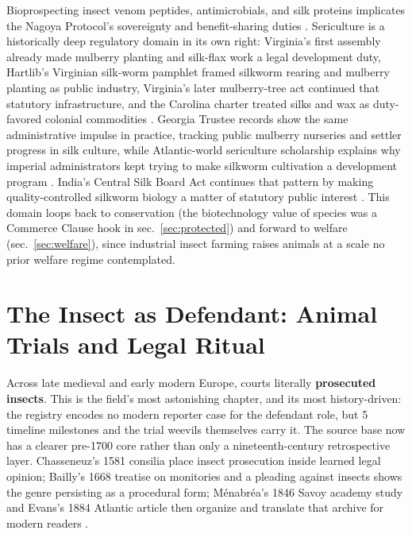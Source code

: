 \documentclass[
  english,
]{article}
\begin{document}
Bioprospecting insect venom peptides, antimicrobials, and silk proteins
implicates the Nagoya Protocol's sovereignty and benefit-sharing duties
\citep{nagoya2010}. Sericulture is a historically deep regulatory domain
in its own right: Virginia's first assembly already made mulberry
planting and silk-flax work a legal development duty, Hartlib's
Virginian silk-worm pamphlet framed silkworm rearing and mulberry
planting as public industry, Virginia's later mulberry-tree act
continued that statutory infrastructure, and the Carolina charter
treated silks and wax as duty-favored colonial commodities
\citep{virginia_assembly1619_mulberry, hartlib1655_silkworm, virginia_mulberry1658, carolina_charter1663_silks_wax}.
Georgia Trustee records show the same administrative impulse in
practice, tracking public mulberry nurseries and settler progress in
silk culture, while Atlantic-world sericulture scholarship explains why
imperial administrators kept trying to make silkworm cultivation a
development program
\citep{egmont_georgia_trustees1736, marsh2020_england_virginia_sericulture, marsh2020_lower_south_sericulture}.
India's Central Silk Board Act continues that pattern by making
quality-controlled silkworm biology a matter of statutory public
interest \citep{csb1948}. This domain loops back to conservation (the
biotechnology value of species was a Commerce Clause hook in
sec.~\ref{sec:protected}) and forward to welfare
(sec.~\ref{sec:welfare}), since industrial insect farming raises animals
at a scale no prior welfare regime contemplated.

\newpage

\section{The Insect as Defendant: Animal Trials and Legal
Ritual}\label{sec:defendant}

Across late medieval and early modern Europe, courts literally
\textbf{prosecuted insects}. This is the field's most astonishing
chapter, and its most history-driven: the registry encodes no modern
reporter case for the defendant role, but 5 timeline milestones and the
trial weevils themselves carry it. The source base now has a clearer
pre-1700 core rather than only a nineteenth-century retrospective layer.
Chasseneuz's 1581 consilia place insect prosecution inside learned legal
opinion; Bailly's 1668 treatise on monitories and a pleading against
insects shows the genre persisting as a procedural form; Ménabréa's 1846
Savoy academy study and Evans's 1884 Atlantic article then organize and
translate that archive for modern readers
\citep{chasseneuz1581_consilia, bailly1668_monitoires_insectes, menabrea1846_animal_judgments, evans1884_bugs_beasts, evans1906, beirne1994_evans}.
\end{document}
